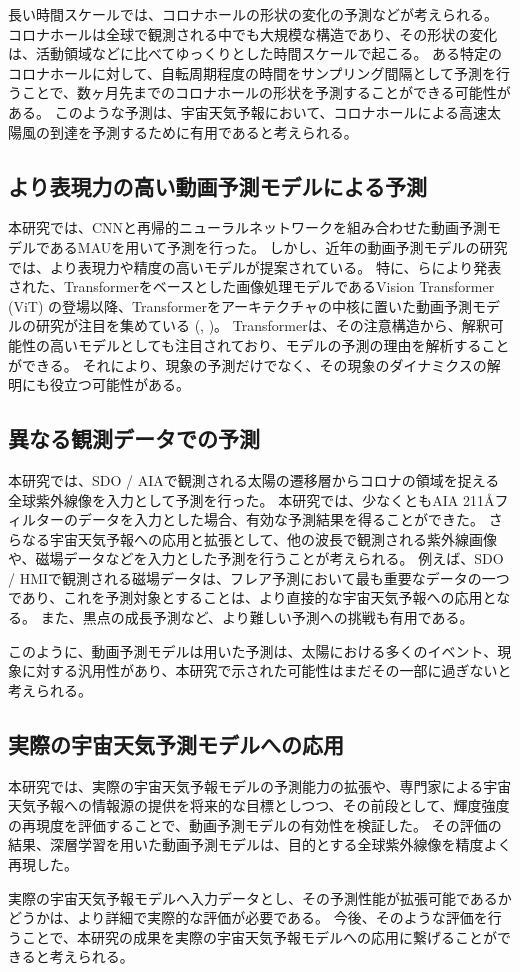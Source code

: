     長い時間スケールでは、コロナホールの形状の変化の予測などが考えられる。
    コロナホールは全球で観測される中でも大規模な構造であり、その形状の変化は、活動領域などに比べてゆっくりとした時間スケールで起こる。
    ある特定のコロナホールに対して、自転周期程度の時間をサンプリング間隔として予測を行うことで、数ヶ月先までのコロナホールの形状を予測することができる可能性がある。
    このような予測は、宇宙天気予報において、コロナホールによる高速太陽風の到達を予測するために有用であると考えられる。

  \subsection{より表現力の高い動画予測モデルによる予測}
    本研究では、CNNと再帰的ニューラルネットワークを組み合わせた動画予測モデルであるMAUを用いて予測を行った。
    しかし、近年の動画予測モデルの研究では、より表現力や精度の高いモデルが提案されている。
    特に、らにより発表された、Transformerをベースとした画像処理モデルであるVision Transformer (ViT) の登場以降、Transformerをアーキテクチャの中核に置いた動画予測モデルの研究が注目を集めている (,  )。
    Transformerは、その注意構造から、解釈可能性の高いモデルとしても注目されており、モデルの予測の理由を解析することができる。
    それにより、現象の予測だけでなく、その現象のダイナミクスの解明にも役立つ可能性がある。

  \subsection{異なる観測データでの予測}
    本研究では、SDO / AIAで観測される太陽の遷移層からコロナの領域を捉える全球紫外線像を入力として予測を行った。
    本研究では、少なくともAIA 211\AA フィルターのデータを入力とした場合、有効な予測結果を得ることができた。
    さらなる宇宙天気予報への応用と拡張として、他の波長で観測される紫外線画像や、磁場データなどを入力とした予測を行うことが考えられる。
    例えば、SDO / HMIで観測される磁場データは、フレア予測において最も重要なデータの一つであり、これを予測対象とすることは、より直接的な宇宙天気予報への応用となる。
    また、黒点の成長予測など、より難しい予測への挑戦も有用である。

    このように、動画予測モデルは用いた予測は、太陽における多くのイベント、現象に対する汎用性があり、本研究で示された可能性はまだその一部に過ぎないと考えられる。

  \subsection{実際の宇宙天気予測モデルへの応用}
    本研究では、実際の宇宙天気予報モデルの予測能力の拡張や、専門家による宇宙天気予報への情報源の提供を将来的な目標としつつ、その前段として、輝度強度の再現度を評価することで、動画予測モデルの有効性を検証した。
    その評価の結果、深層学習を用いた動画予測モデルは、目的とする全球紫外線像を精度よく再現した。

    実際の宇宙天気予報モデルへ入力データとし、その予測性能が拡張可能であるかどうかは、より詳細で実際的な評価が必要である。
    今後、そのような評価を行うことで、本研究の成果を実際の宇宙天気予報モデルへの応用に繋げることができると考えられる。
  
